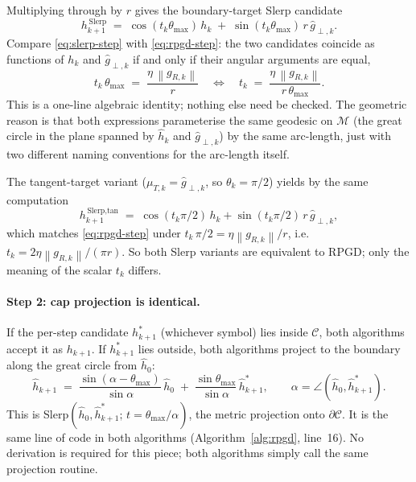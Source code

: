 \documentclass[11pt]{article}
\newcommand{\hh}{\hat h}
\newcommand{\thmax}{\theta_{\max}}
\newcommand{\norm}[1]{\left\lVert#1\right\rVert}
\begin{document}
Multiplying through by $r$ gives the boundary-target Slerp candidate
\begin{equation}
h_{k+1}^{\,\text{Slerp}} \;=\; \cos(t_k\thmax)\,h_k \;+\; \sin(t_k\thmax)\,r\,\hat g_{\perp,k}.
\label{eq:slerp-step}
\end{equation}
Compare \eqref{eq:slerp-step} with \eqref{eq:rpgd-step}: the two candidates coincide as functions of $h_k$ and $\hat g_{\perp,k}$ if and only if their angular arguments are equal,
\begin{equation}
t_k\,\thmax \;=\; \frac{\eta\,\norm{g_{R,k}}}{r} \quad\Longleftrightarrow\quad t_k \;=\; \frac{\eta\,\norm{g_{R,k}}}{r\,\thmax}.
\label{eq:tk-eta}
\end{equation}
This is a one-line algebraic identity; nothing else need be checked. The geometric reason is that both expressions parameterise the same geodesic on $\mathcal{M}$ (the great circle in the plane spanned by $\hh_k$ and $\hat g_{\perp,k}$) by the same arc-length, just with two different naming conventions for the arc-length itself.

The tangent-target variant ($\mu_{T,k} = \hat g_{\perp,k}$, so $\theta_k = \pi/2$) yields by the same computation
\begin{equation*}
h_{k+1}^{\,\text{Slerp,tan}} \;=\; \cos(t_k\pi/2)\,h_k + \sin(t_k\pi/2)\,r\,\hat g_{\perp,k},
\end{equation*}
which matches \eqref{eq:rpgd-step} under $t_k\,\pi/2 = \eta\norm{g_{R,k}}/r$, i.e.\ $t_k = 2\eta\norm{g_{R,k}}/(\pi r)$. So both Slerp variants are equivalent to RPGD; only the meaning of the scalar $t_k$ differs.

\paragraph{Step 2: cap projection is identical.} If the per-step candidate $h_{k+1}^*$ (whichever symbol) lies inside $\mathcal{C}$, both algorithms accept it as $h_{k+1}$. If $h_{k+1}^*$ lies outside, both algorithms project to the boundary along the great circle from $\hh_0$:
\begin{equation*}
\hh_{k+1} \;=\; \frac{\sin(\alpha - \thmax)}{\sin\alpha}\,\hh_0 \;+\; \frac{\sin\thmax}{\sin\alpha}\,\hh_{k+1}^*, \qquad \alpha = \angle(\hh_0, \hh_{k+1}^*).
\end{equation*}
This is Slerp$(\hh_0, \hh_{k+1}^*;\, t = \thmax/\alpha)$, the metric projection onto $\partial\mathcal{C}$. It is the same line of code in both algorithms (Algorithm~\ref{alg:rpgd}, line~16). No derivation is required for this piece; both algorithms simply call the same projection routine.
\end{document}
